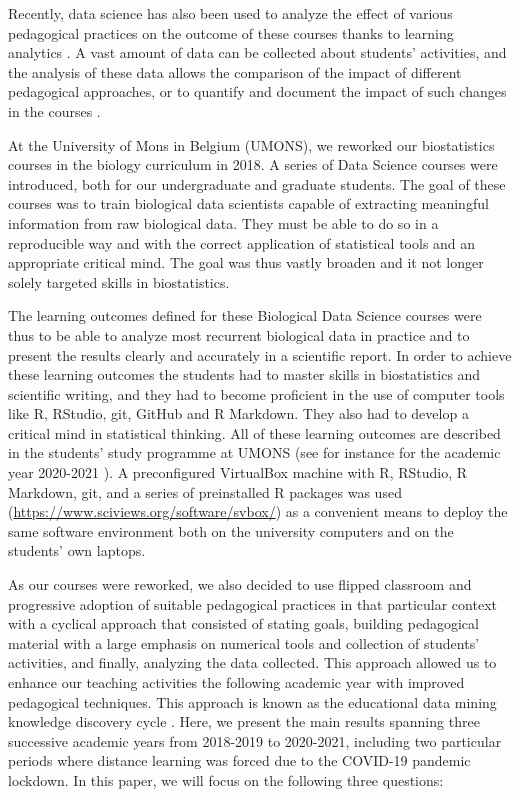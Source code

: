 \documentclass{aims}
\theoremstyle{definition}
\begin{document}
Recently, data science has also been used to analyze the effect of
various pedagogical practices on the outcome of these courses thanks to
learning analytics \cite{Estrellado2020}. A vast amount of data can be
collected about students' activities, and the analysis of these data
allows the comparison of the impact of different pedagogical approaches,
or to quantify and document the impact of such changes in the courses
\cite{Romero2020}.

At the University of Mons in Belgium (UMONS), we reworked our
biostatistics courses in the biology curriculum in 2018. A series of
Data Science courses were introduced, both for our undergraduate and
graduate students. The goal of these courses was to train biological
data scientists capable of extracting meaningful information from raw
biological data. They must be able to do so in a reproducible way and
with the correct application of statistical tools and an appropriate
critical mind. The goal was thus vastly broaden and it not longer solely
targeted skills in biostatistics.

The learning outcomes defined for these Biological Data Science courses
were thus to be able to analyze most recurrent biological data in
practice and to present the results clearly and accurately in a
scientific report. In order to achieve these learning outcomes the
students had to master skills in biostatistics and scientific writing,
and they had to become proficient in the use of computer tools like R,
RStudio, git, GitHub and R Markdown. They also had to develop a critical
mind in statistical thinking. All of these learning outcomes are
described in the students' study programme at UMONS (see for instance
for the academic year 2020-2021
\cite{ds1bio2021, ds2bio2021, ds3bio2021}). A preconfigured VirtualBox
machine with R, RStudio, R Markdown, git, and a series of preinstalled R
packages was used (\url{https://www.sciviews.org/software/svbox/}) as a
convenient means to deploy the same software environment both on the
university computers and on the students' own laptops.

As our courses were reworked, we also decided to use flipped classroom
and progressive adoption of suitable pedagogical practices in that
particular context with a cyclical approach that consisted of stating
goals, building pedagogical material with a large emphasis on numerical
tools and collection of students' activities, and finally, analyzing the
data collected. This approach allowed us to enhance our teaching
activities the following academic year with improved pedagogical
techniques. This approach is known as the educational data mining
knowledge discovery cycle \cite{Romero2020}. Here, we present the main
results spanning three successive academic years from 2018-2019 to
2020-2021, including two particular periods where distance learning was
forced due to the COVID-19 pandemic lockdown. In this paper, we will
focus on the following three questions:
\end{document}
